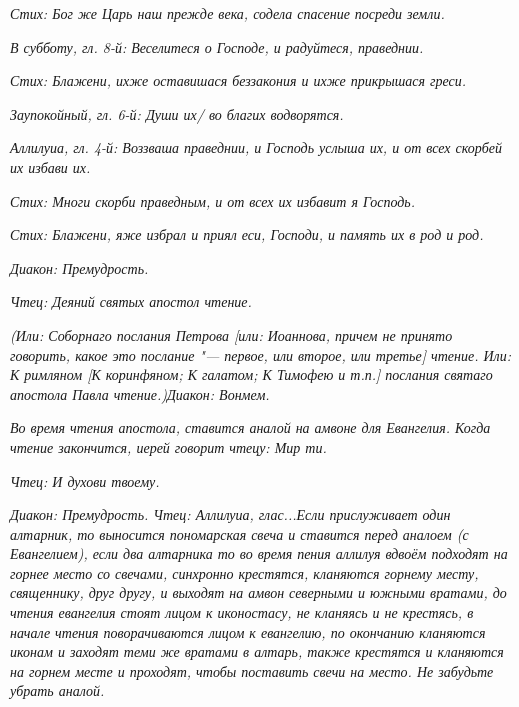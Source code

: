 \itshape Стих:\normalfont{} Бог же Царь наш прежде века, содела спасение посреди земли. 


\itshape В субботу, гл. 8-й:\normalfont{} Веселитеся о Господе, и радуйтеся, праведнии.


\itshape  Стих:\normalfont{} Блажени, ихже оставишася беззакония и ихже прикрышася греси.


\itshape  Заупокойный, гл. 6-й:\normalfont{} Души их/ во благих водворятся.


\itshape  Аллилуиа, гл. 4-й:\normalfont{} Воззваша праведнии, и Господь услыша их, и от всех скорбей их избави их.


\itshape  Стих:\normalfont{} Многи скорби праведным, и от всех их избавит я Господь.


\itshape  Стих:\normalfont{} Блажени, яже избрал и приял еси, Господи, и память их в род и род.


\itshape Диакон:\normalfont{} Премудрость.


\itshape  Чтец:\normalfont{} Деяний святых апостол чтение.


\itshape (Или:\normalfont{} Соборнаго послания Петрова \itshape [или:\normalfont{} Иоаннова\itshape , причем не принято говорить, какое это послание "--- первое, или второе, или третье\normalfont{}] чтение\itshape . Или:\normalfont{} К римляном [К коринфяном; К галатом; К Тимофе\itshape ю и т.п.\normalfont{}] послания святаго апостола Павла чтение.)\itshape  Диакон:\normalfont{} Вонмем.



\itshape Во время чтения апостола, ставится аналой на амвоне для Евангелия. Когда чтение закончится, иерей говорит чтецу:\normalfont{} Мир ти.


\itshape  Чтец:\normalfont{} И духови твоему.




\itshape Диакон:\normalfont{} Премудрость.
\itshape Чтец:\normalfont{} Аллилуиа, глас...\itshape  Если прислуживает один алтарник, то выносится пономарская свеча и ставится перед аналоем (с Евангелием), если два алтарника то во время пения аллилуя вдвоём подходят на горнее место со свечами, синхронно крестятся, кланяются горнему месту, священнику, друг другу, и выходят на амвон северными и южными вратами, до чтения евангелия стоят лицом к иконостасу, не кланяясь и не крестясь, в начале чтения поворачиваются лицом к евангелию, по окончанию кланяются иконам и заходят теми же вратами в алтарь, также крестятся и кланяются на горнем месте и проходят, чтобы поставить свечи на место. Не забудьте убрать аналой.\normalfont{}


